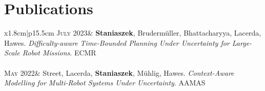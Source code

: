 \documentclass[a4paper,10pt]{article}
\newcommand{\datelen}{1.8cm}
\newcommand{\descrlen}{15.5cm}
\begin{document}
\section{Publications}
\begin{tabular}{x{\datelen}|p{\descrlen}}
  \textsc{July 2023}& \textbf{Staniaszek}, Brudermüller, Bhattacharyya, Lacerda, Hawes. \emph{Difficulty-aware Time-Bounded Planning Under Uncertainty for Large-Scale Robot Missions}. ECMR\\\\[-0.2cm]
  \textsc{May 2022}& Street, Lacerda, \textbf{Staniaszek}, Mühlig, Hawes. \emph{Context-Aware Modelling for Multi-Robot Systems Under Uncertainty}. AAMAS\\

\end{tabular}
\end{document}
